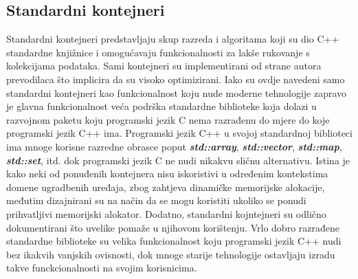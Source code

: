 \subsection{Standardni kontejneri}
Standardni kontejneri predstavljaju skup razreda i algoritama koji su dio C++ standardne knjižnice i omogućavaju funkcionalnosti za lakše rukovanje s kolekcijama podataka. Sami kontejneri su implementirani od strane autora prevodilaca što implicira da su visoko optimizirani. Iako su ovdje navedeni samo standardni kontejneri kao funkcionalnost koju nude moderne tehnologije zapravo je glavna funkcionalnost veća podrška standardne biblioteke koja dolazi u razvojnom paketu koju programski jezik C nema razrađenu do mjere do koje programski jezik C++ ima. Programski jezik C++ u svojoj standardnoj biblioteci ima mnoge korisne razredne obrasce poput \textbf{\textit{std::array}}, \textbf{\textit{std::vector}}, \textbf{\textit{std::map}}, \textbf{\textit{std::set}}, itd. dok programski jezik C ne nudi nikakvu sličnu alternativu. Istina je kako neki od ponuđenih kontejnera nisu iskoristivi u određenim kontekstima domene ugradbenih uređaja, zbog zahtjeva dinamičke memorijske alokacije, međutim dizajnirani su na način da se mogu koristiti ukoliko se ponudi prihvatljivi memorijski alokator. Dodatno, standardni kojntejneri su odlično dokumentirani što uvelike pomaže u njihovom korištenju. Vrlo dobro razrađene standardne biblioteke su velika funkcionalnost koju programski jezik C++ nudi bez ikakvih vanjskih ovisnosti, dok mnoge starije tehnologije ostavljaju izradu takve funckcionalnosti na svojim korisnicima.  